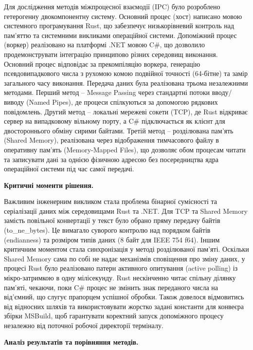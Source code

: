 \documentclass[14pt, a4paper]{extreport}
\begin{document}
	Для дослідження методів міжпроцесної взаємодії (IPC) було розроблено гетерогенну двокомпонентну систему. Основний процес (хост) написано мовою системного програмування Rust, що забезпечує низькорівневий контроль над пам'яттю та системними викликами операційної системи. Допоміжний процес (воркер) реалізовано на платформі .NET мовою C\#, що дозволило продемонструвати інтеграцію принципово різних середовищ виконання. Основний процес відповідає за прекомпіляцію воркера, генерацію псевдовипадкового числа з рухомою комою подвійної точності (64-бітне) та замір загального часу виконання. Передача даних була реалізована трьома незалежними методами. Перший метод -- Message Passing через стандартні потоки вводу/виводу (Named Pipes), де процеси спілкуються за допомогою рядкових повідомлень. Другий метод -- локальні мережеві сокети (TCP), де Rust відкриває сервер на випадковому вільному порту, а C\# підключається як клієнт для двостороннього обміну сирими байтами. Третій метод -- розділювана пам'ять (Shared Memory), реалізована через відображення тимчасового файлу в оперативну пам'ять (Memory-Mapped Files), що дозволяє обом процесам читати та записувати дані за однією фізичною адресою без посередництва ядра операційної системи під час самої передачі.
	
	
	\textbf{Критичні моменти рішення.}
	
	Важливим інженерним викликом стала проблема бінарної сумісності та серіалізації даних між середовищами Rust та .NET. Для TCP та Shared Memory замість повільної конвертації у текст було обрано пряму передачу байтів (to\_ne\_bytes). Це вимагало суворого контролю над порядком байтів (endianness) та розміром типів даних (8 байт для IEEE 754 f64). Іншим критичним моментом стала синхронізація у методі розділюваної пам'яті. Оскільки Shared Memory сама по собі не надає механізмів сповіщення про зміну даних, у процесі Rust було реалізовано патерн активного опитування (active polling) із мікро-затримкою в одну мілісекунду. Rust нескінченно читає спільну ділянку пам'яті, чекаючи, поки C\# процес не змінить знак переданого числа на від'ємний, що слугує прапорцем успішної обробки. Також довелося відмовитись від відносних шляхів та використовувати жорстко задані константи для конвеєра збірки MSBuild, щоб гарантувати коректний запуск допоміжного процесу незалежно від поточної робочої директорії терміналу.
	
	\textbf{Аналіз результатів та порівняння методів.}
	
\end{document}

